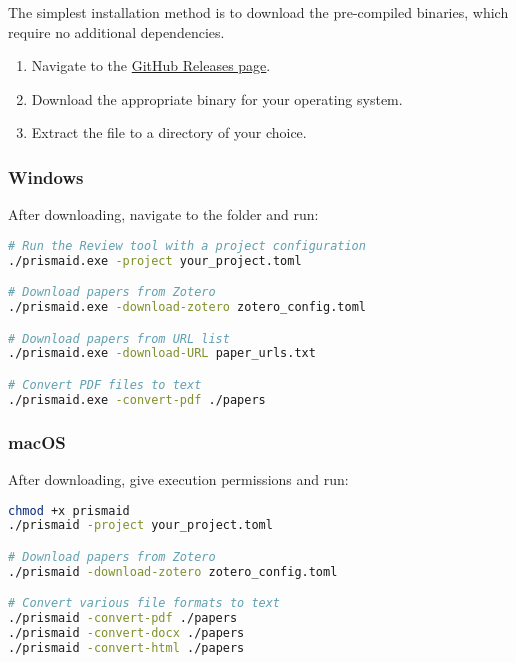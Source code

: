 The simplest installation method is to download the pre-compiled binaries, which require no additional dependencies.

\begin{enumerate}
    \item Navigate to the \href{https://github.com/open-and-sustainable/prismaid/releases}{GitHub Releases page}.
    \item Download the appropriate binary for your operating system.
    \item Extract the file to a directory of your choice.
\end{enumerate}

\subsubsection{Windows}
\begin{commandbox}
After downloading, navigate to the folder and run:
\begin{lstlisting}[language=Bash]
# Run the Review tool with a project configuration
./prismaid.exe -project your_project.toml

# Download papers from Zotero
./prismaid.exe -download-zotero zotero_config.toml

# Download papers from URL list
./prismaid.exe -download-URL paper_urls.txt

# Convert PDF files to text
./prismaid.exe -convert-pdf ./papers
\end{lstlisting}
\end{commandbox}


\subsubsection{macOS}
\begin{commandbox}
After downloading, give execution permissions and run:
\begin{lstlisting}[language=Bash]
chmod +x prismaid
./prismaid -project your_project.toml

# Download papers from Zotero
./prismaid -download-zotero zotero_config.toml

# Convert various file formats to text
./prismaid -convert-pdf ./papers
./prismaid -convert-docx ./papers
./prismaid -convert-html ./papers
\end{lstlisting}
\end{commandbox}

